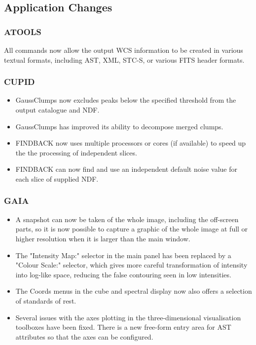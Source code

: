 \documentclass[11pt,twoside]{article}
\begin{document}
\subsection{Application Changes}

\subsubsection{ATOOLS}
All commands now allow the output WCS information to be created
in various textual formats, including AST, XML, STC-S, or
various FITS header formats.

\subsubsection{CUPID}
\begin{itemize}
\item GaussClumps now excludes peaks below the specified threshold from the output catalogue and NDF.
\item GaussClumps has improved its ability to decompose merged clumps.
\item FINDBACK now uses multiple processors or cores (if available) to speed up the the processing of independent slices.
\item FINDBACK can now find and use an independent default noise value for each slice of supplied NDF.
\end{itemize}

\subsubsection{GAIA}
\begin{itemize}
\item A snapshot can now be taken of the whole image, including the off-screen parts, so it is now possible to capture a graphic of the whole image at full or higher resolution when it is larger than the main window.
\item The "Intensity Map:" selector in the main panel has been replaced by a "Colour Scale:" selector, which gives more careful transformation of intensity into log-like space, reducing the false contouring seen in low intensities.
\item The Coords menus in the cube and spectral display now also offers a selection of standards of rest.
\item Several issues with the axes plotting in the three-dimensional visualisation toolboxes have been fixed. There is a new free-form entry area for AST attributes so that the axes can be configured.
\end{itemize}
\end{document}
